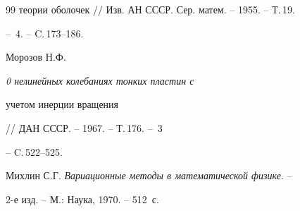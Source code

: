 \begin{thebibliography}{99}
{теории оболочек} // Изв. АН СССР. Сер. матем. -- 1955. -- Т.\,19. 


-- \No\,4. -- C.\,173--186. 




Морозов Н.Ф. {\em 0 нелинейных колебаниях тонких пластин с 


учетом инерции вращения} // ДАН СССР. -- 1967. -- Т.\,176. -- \No\,3 


-- C.\,522--525. 




Михлин С.Г. {\em Вариационные методы в математической физике}. -- 


2-е изд. -- М.: Наука, 1970. -- 512~с. 


 


\end{thebibliography} 


 


\vskip 2cm 


 






 


 


